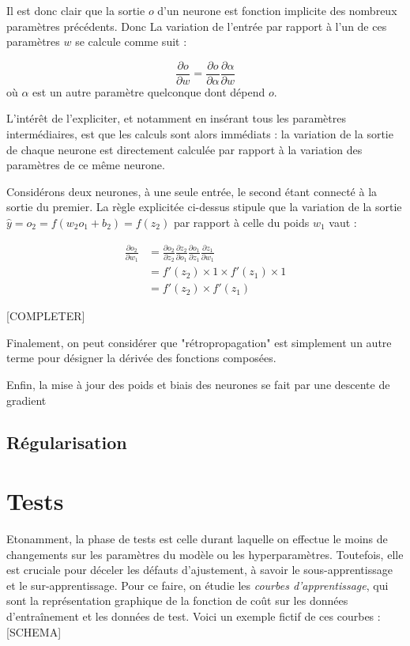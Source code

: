 Il est donc clair que la sortie \(o\) d'un neurone est fonction implicite des nombreux paramètres précédents. Donc La variation de l'entrée par rapport à l'un de ces paramètres \(w\) se calcule comme suit : 

\begin{equation}\label{eq:deriv_compos}
\frac{\partial o}{\partial w} = \frac{\partial o}{\partial \alpha} \frac{\partial \alpha}{\partial w}
\end{equation}
où \(\alpha\) est un autre paramètre quelconque dont dépend \(o\).

L'intérêt de l'expliciter, et notamment en insérant tous les paramètres intermédiaires, est que les calculs sont alors immédiats : la variation de la sortie de chaque neurone est directement calculée par rapport à la variation des paramètres de ce même neurone.

Considérons deux neurones, à une seule entrée, le second étant connecté à la sortie du premier. La règle explicitée ci-dessus stipule que la variation de la sortie \(\hat{y} = o_2 = f(w_2 o_1 + b_2) = f(z_2)\) par rapport à celle du poids \(w_1\) vaut : 

\begin{align*}
\frac{\partial o_2}{\partial w_1} &= \frac{\partial o_2}{\partial z_2} \frac{\partial z_2}{\partial o_1} \frac{\partial o_1}{\partial z_1} \frac{\partial z_1}{\partial w_1}\\
&= f'(z_2) \times 1 \times f'(z_1) \times 1\\
&= f'(z_2) \times f'(z_1)
\end{align*}

[COMPLETER]

Finalement, on peut considérer que "rétropropagation" est simplement un autre terme pour désigner la dérivée des fonctions composées.

Enfin, la mise à jour des poids et biais des neurones se fait par une descente de gradient

\subsection{Régularisation}




\section{Tests}
Etonamment, la phase de tests est celle durant laquelle on effectue le moins de changements sur les paramètres du modèle ou les hyperparamètres. Toutefois, elle est cruciale pour déceler les défauts d'ajustement, à savoir le sous-apprentissage et le sur-apprentissage. Pour ce faire, on étudie les \emph{courbes d'apprentissage}, qui sont la représentation graphique de la fonction de coût sur les données d'entraînement et les données de test. Voici un exemple fictif de ces courbes : 
[SCHEMA]

